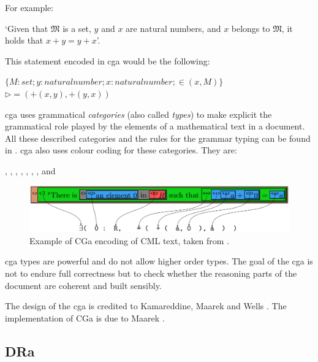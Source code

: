For example:

\begin{center}
`Given that $\mathfrak{M}$ is a set, $y$ and $x$ are natural numbers, and $x$
belongs to $\mathfrak{M}$, it holds that $x+ y=y+x$'.
\end{center}

This statement encoded in \gls{cga} would be the following:

\begin{center}
$\{M : set; y : natural number; x : natural number; \in(x, M)\}$\\
$\rhd =(+(x, y), +(y, x)) $
\end{center}

\Gls{cga} uses grammatical \emph{categories} (also called \emph{types}) to make
explicit the grammatical role played by the elements of a mathematical text in a
document. All these described categories and the rules for the grammar typing
can be found in \cite{wtt}. \Gls{cga} also uses colour coding for these
categories. They are:

\begin{center}
, , , , , , ,  and 
\end{center}

\begin{figure}[H]
\begin{center}
\includegraphics[scale=0.35]{Figures/Background/cgaannotatedtext.png}
\end{center}
\caption{Example of CGa encoding of CML text, taken from \cite{KAMAREDDINE20085}. \label{fig:cgannotated}}
\end{figure}

\Gls{cga} types are powerful and do not allow higher order types.
The goal of the \gls{cga} is not to endure
full correctness but to check whether the reasoning parts of the document are
coherent and built sensibly. 

The design of the \gls{cga} is credited to Kamareddine, Maarek and Wells
\cite{oomathlang}. The implementation of CGa is due to Maarek \cite{manuelphd}.

\subsection{DRa}
\label{subsec:dra}

